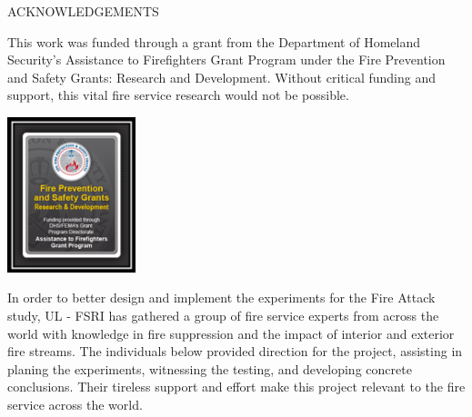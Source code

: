 \documentclass{article}
\begin{document}
\begin{center}
	ACKNOWLEDGEMENTS
\vspace*{\baselineskip}
\begin{adjustwidth}{-0.25in}{-0.25in}
This work was funded through a grant from the Department of Homeland Security's Assistance to Firefighters Grant Program under the Fire Prevention and Safety Grants: Research and Development. Without critical funding and support, this vital fire service research would not be possible.

\vspace*{\baselineskip}

\begin{center}
	\includegraphics[width=0.28\textwidth]{Figures/General/DHS.png}
\end{center}

\clearpage

In order to better design and implement the experiments for the Fire Attack study, UL - FSRI has gathered a group of fire service experts from across the world with knowledge in fire suppression and the impact of interior and exterior fire streams. The individuals below provided direction for the project, assisting in planing the experiments, witnessing the testing, and developing concrete conclusions. Their tireless support and effort make this project relevant to the fire service across the world. 

\vspace*{\baselineskip}

\renewcommand{\arraystretch}{1.5}


\end{adjustwidth}
\end{center}
\end{document}
